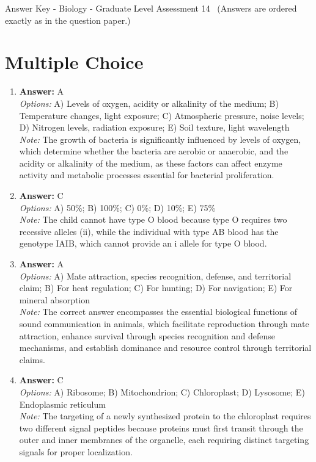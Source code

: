 \documentclass[12pt]{article}
\begin{document}
\begin{center}
Answer Key - Biology - Graduate Level Assessment 14 \
\small (Answers are ordered exactly as in the question paper.)
\end{center}

\section*{Multiple Choice}
\begin{enumerate}[label=\arabic*.]
\item \textbf{Answer:} A
\\ \textit{Options:} A) Levels of oxygen, acidity or alkalinity of the medium; B) Temperature changes, light exposure; C) Atmospheric pressure, noise levels; D) Nitrogen levels, radiation exposure; E) Soil texture, light wavelength
\\ \textit{Note:} The growth of bacteria is significantly influenced by levels of oxygen, which determine whether the bacteria are aerobic or anaerobic, and the acidity or alkalinity of the medium, as these factors can affect enzyme activity and metabolic processes essential for bacterial proliferation.
\item \textbf{Answer:} C
\\ \textit{Options:} A) 50\%; B) 100\%; C) 0\%; D) 10\%; E) 75\%
\\ \textit{Note:} The child cannot have type O blood because type O requires two recessive alleles (ii), while the individual with type AB blood has the genotype IAIB, which cannot provide an i allele for type O blood.
\item \textbf{Answer:} A
\\ \textit{Options:} A) Mate attraction, species recognition, defense, and territorial claim; B) For heat regulation; C) For hunting; D) For navigation; E) For mineral absorption
\\ \textit{Note:} The correct answer encompasses the essential biological functions of sound communication in animals, which facilitate reproduction through mate attraction, enhance survival through species recognition and defense mechanisms, and establish dominance and resource control through territorial claims.
\item \textbf{Answer:} C
\\ \textit{Options:} A) Ribosome; B) Mitochondrion; C) Chloroplast; D) Lysosome; E) Endoplasmic reticulum
\\ \textit{Note:} The targeting of a newly synthesized protein to the chloroplast requires two different signal peptides because proteins must first transit through the outer and inner membranes of the organelle, each requiring distinct targeting signals for proper localization.

\end{enumerate}
\end{document}
